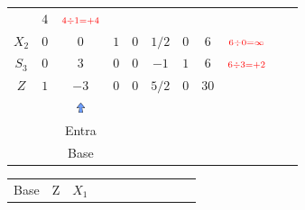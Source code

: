 \begin{frame}
{\begin{table}
\begin{tabular}{c c c c c c c c c c c}
				& \cellcolor{gray!50} $\scriptstyle 4$
				& $\scriptstyle \color{red} 4 \div 1 = +4$
				&
				& \\
				\cline{1-8} 
			    \cellcolor{blue!100} \color{red} $\scriptstyle X_2$
				& \cellcolor{yellow!50} $\scriptstyle 0$
				& \cellcolor{gray!50} $\scriptstyle 0$
				& \cellcolor{yellow!50} $\scriptstyle 1$
				& \cellcolor{yellow!50} $\scriptstyle 0$			
				& \cellcolor{yellow!50} $\scriptstyle 1/2$
				& \cellcolor{yellow!50} $\scriptstyle 0$
				& \cellcolor{gray!50} $\scriptstyle 6$
				& $\scriptstyle \color{red}  6 \div 0 = \infty$
				&
				& \\
				\cline{1-8} 
				\cellcolor{blue!100} \color{red} $\scriptstyle S_3$
				& \cellcolor{yellow!50} $\scriptstyle 0$
				& \cellcolor{gray!50} $\scriptstyle 3$
				& \cellcolor{yellow!50} $\scriptstyle 0$
				& \cellcolor{yellow!50} $\scriptstyle 0$
				& \cellcolor{yellow!50} $\scriptstyle -1$
				& \cellcolor{yellow!50} $\scriptstyle 1$
				& \cellcolor{gray!50} $\scriptstyle 6$
				& $\scriptstyle \color{red}  6 \div 3 = +2$
				&
				& \\
				\cline{1-8}
				\cellcolor{blue!100} \color{white} $\scriptstyle Z$
				& \cellcolor{yellow!50} $\scriptstyle 1$
				& \cellcolor{gray!50} $\scriptstyle -3$
				& \cellcolor{yellow!50} $\scriptstyle 0$
				& \cellcolor{yellow!50} $\scriptstyle 0$
				& \cellcolor{yellow!50} $\scriptstyle 5/2$
				& \cellcolor{yellow!50} $\scriptstyle 0$
				& \cellcolor{gray!50} $\scriptstyle 30$ 
				&
				&
				& \\
				\cline{1-8}
				& 
				& \includegraphics[width=0.3cm,height=0.3cm]{setacima.jpg}
				& 
				& 
				& 
				& 
				&  
				&
				&
				& \\ 
				& 
				& \scriptsize \color{red} Entra
				&  
				& 
				& 
				& 
				&  
				&
				&
				& \\
				& 
				& \scriptsize \color{red} Base
				&  
				& 
				& 
				& 
				&  
				&
				&
				& \\
			\end{tabular}
		\end{table}			
	}	
	{		
		\begin{table}		
			\begin{tabular}{c c c c c c c c c c c}
				\cline{1-8} 
				\cellcolor{blue!100} \color{white} \scriptsize Base 
				&\cellcolor{blue!100} \color{white} \scriptsize Z 
				&\cellcolor{blue!100} \color{white} $\scriptstyle X_1$ 

\end{tabular}
\end{table}}
\end{frame}
